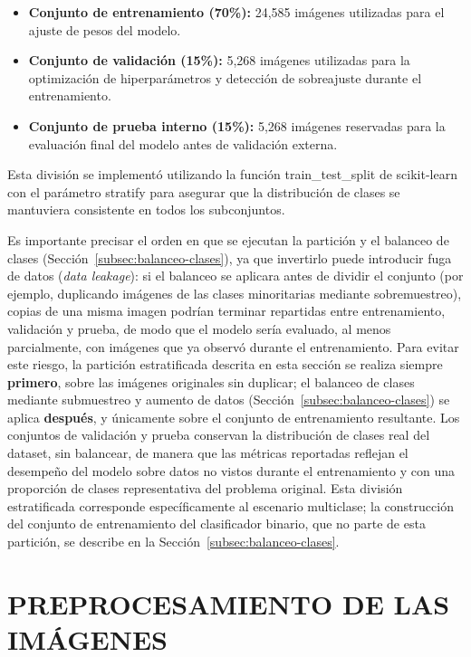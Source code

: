 \begin{itemize}
    \item \textbf{Conjunto de entrenamiento (70\%):} 24,585 imágenes utilizadas para el 
ajuste de pesos del modelo.
    \item \textbf{Conjunto de validación (15\%):} 5,268 imágenes utilizadas para la 
optimización de hiperparámetros y detección de sobreajuste durante el entrenamiento.
    \item \textbf{Conjunto de prueba interno (15\%):} 5,268 imágenes reservadas para la 
evaluación final del modelo antes de validación externa.
\end{itemize}

Esta división se implementó utilizando la función train\_test\_split de
scikit-learn con el parámetro stratify para asegurar que la distribución de
clases se mantuviera consistente en todos los subconjuntos.

Es importante precisar el orden en que se ejecutan la partición y el balanceo de clases
(Sección~\ref{subsec:balanceo-clases}), ya que invertirlo puede introducir fuga de
datos (\textit{data leakage}): si el balanceo se aplicara antes de dividir el conjunto
(por ejemplo, duplicando imágenes de las clases minoritarias mediante sobremuestreo),
copias de una misma imagen podrían terminar repartidas entre entrenamiento, validación y
prueba, de modo que el modelo sería evaluado, al menos parcialmente, con imágenes que ya
observó durante el entrenamiento. Para evitar este riesgo, la partición
estratificada descrita en esta sección se realiza siempre \textbf{primero}, sobre las
imágenes originales sin duplicar; el balanceo de clases mediante submuestreo y aumento de
datos (Sección~\ref{subsec:balanceo-clases}) se aplica \textbf{después}, y únicamente
sobre el conjunto de entrenamiento resultante. Los conjuntos de validación y prueba
conservan la distribución de clases real del dataset, sin balancear, de manera que las
métricas reportadas reflejan el desempeño del modelo sobre datos no vistos durante el
entrenamiento y con una proporción de clases representativa del problema original. Esta
división estratificada corresponde específicamente al escenario multiclase; la
construcción del conjunto de entrenamiento del clasificador binario, que no parte de esta
partición, se describe en la Sección~\ref{subsec:balanceo-clases}.

\section{PREPROCESAMIENTO DE LAS IMÁGENES} \label{sec:preprocesamiento}

